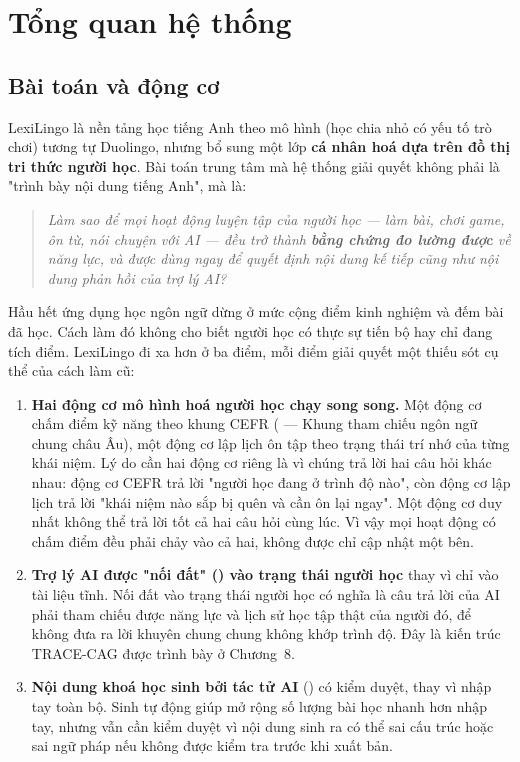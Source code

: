 \chapter{Tổng quan hệ thống}

\section{Bài toán và động cơ}

LexiLingo là nền tảng học tiếng Anh theo mô hình  (học chia
nhỏ có yếu tố trò chơi) tương tự Duolingo, nhưng bổ sung một lớp \textbf{cá nhân hoá dựa
trên đồ thị tri thức người học}. Bài toán trung tâm mà hệ thống giải quyết không phải là
"trình bày nội dung tiếng Anh", mà là:

\begin{quote}
\itshape Làm sao để mọi hoạt động luyện tập của người học — làm bài, chơi game, ôn từ,
nói chuyện với AI — đều trở thành \textbf{bằng chứng đo lường được} về năng lực, và
được dùng ngay để quyết định nội dung kế tiếp cũng như nội dung phản hồi của trợ lý AI?
\end{quote}

Hầu hết ứng dụng học ngôn ngữ dừng ở mức cộng điểm kinh nghiệm và đếm bài đã học. Cách
làm đó không cho biết người học có thực sự tiến bộ hay chỉ đang tích điểm. LexiLingo đi
xa hơn ở ba điểm, mỗi điểm giải quyết một thiếu sót cụ thể của cách làm cũ:

\begin{enumerate}[leftmargin=1.4em]
  \item \textbf{Hai động cơ mô hình hoá người học chạy song song.} Một động cơ chấm
  điểm kỹ năng theo khung CEFR ( — Khung
  tham chiếu ngôn ngữ chung châu Âu), một động cơ lập lịch ôn tập theo trạng thái trí
  nhớ của từng khái niệm. Lý do cần hai động cơ riêng là vì chúng trả lời hai câu hỏi
  khác nhau: động cơ CEFR trả lời "người học đang ở trình độ nào", còn động cơ lập lịch
  trả lời "khái niệm nào sắp bị quên và cần ôn lại ngay". Một động cơ duy nhất không thể
  trả lời tốt cả hai câu hỏi cùng lúc. Vì vậy mọi hoạt động có chấm điểm đều phải chảy
  vào cả hai, không được chỉ cập nhật một bên.
  \item \textbf{Trợ lý AI được "nối đất" () vào trạng thái người học} thay
  vì chỉ vào tài liệu tĩnh. Nối đất vào trạng thái người học có nghĩa là câu trả lời của
  AI phải tham chiếu được năng lực và lịch sử học tập thật của người đó, để không đưa ra
  lời khuyên chung chung không khớp trình độ. Đây là kiến trúc TRACE-CAG được trình bày
  ở Chương~8.
  \item \textbf{Nội dung khoá học sinh bởi tác tử AI} () có kiểm duyệt,
  thay vì nhập tay toàn bộ. Sinh tự động giúp mở rộng số lượng bài học nhanh hơn nhập tay,
  nhưng vẫn cần kiểm duyệt vì nội dung sinh ra có thể sai cấu trúc hoặc sai ngữ pháp nếu
  không được kiểm tra trước khi xuất bản.
\end{enumerate}

